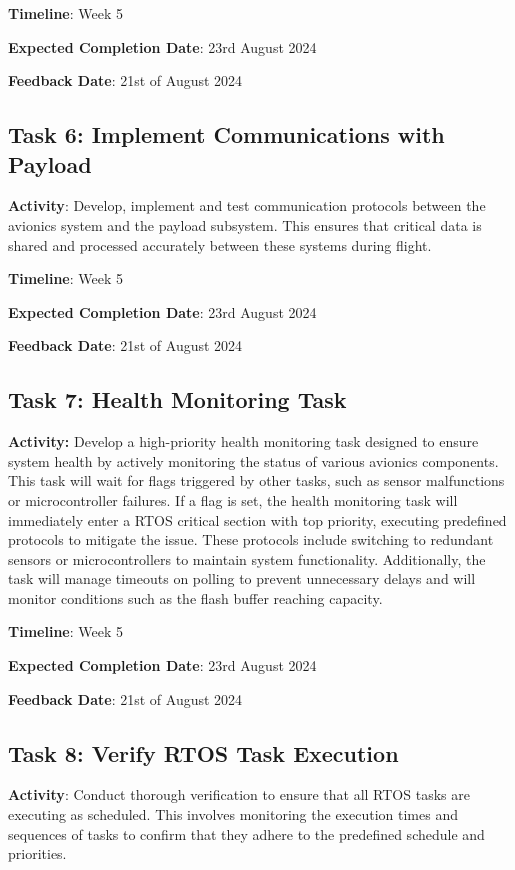 \textbf{Timeline}: Week 5

\textbf{Expected Completion Date}: 23rd August 2024

\textbf{Feedback Date}: 21st of August 2024

\subsection{Task 6: Implement Communications with Payload}
\textbf{Activity}: Develop, implement and test communication protocols between the avionics system and the payload subsystem. This ensures that critical data is shared and processed accurately between these systems during flight. 

\textbf{Timeline}: Week 5

\textbf{Expected Completion Date}: 23rd August 2024

\textbf{Feedback Date}: 21st of August 2024

\subsection{Task 7: Health Monitoring Task}
\textbf{Activity:} Develop a high-priority health monitoring task designed to ensure system health by actively monitoring the status of various avionics components. This task will wait for flags triggered by other tasks, such as sensor malfunctions or microcontroller failures. If a flag is set, the health monitoring task will immediately enter a RTOS critical section with top priority, executing predefined protocols to mitigate the issue. These protocols include switching to redundant sensors or microcontrollers to maintain system functionality. Additionally, the task will manage timeouts on polling to prevent unnecessary delays and will monitor conditions such as the flash buffer reaching capacity. 

\textbf{Timeline}: Week 5

\textbf{Expected Completion Date}: 23rd August 2024

\textbf{Feedback Date}: 21st of August 2024

\subsection{Task 8: Verify RTOS Task Execution}
\textbf{Activity}: Conduct thorough verification to ensure that all RTOS tasks are executing as scheduled. This involves monitoring the execution times and sequences of tasks to confirm that they adhere to the predefined schedule and priorities. 


